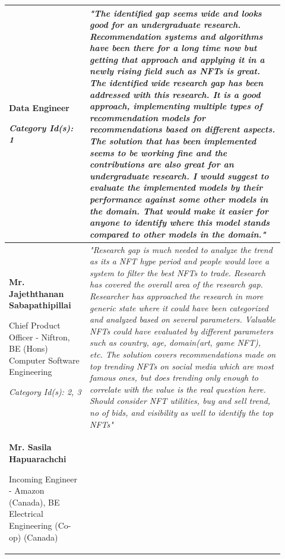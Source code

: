 \begin{longtable}{|p{0.27\linewidth}|p{0.655\linewidth}|}
Data Engineer

\textit{Category Id(s): 1}
&
\textit{"The identified gap seems wide and looks good for an undergraduate research. Recommendation systems and algorithms have been there for a long time now but getting that approach and applying it in a newly rising field such as NFTs is great. The identified wide research gap has been addressed with this research. It is a good approach, implementing multiple types of recommendation models for recommendations based on different aspects. The solution that has been implemented seems to be working fine and the contributions are also great for an undergraduate research. I would suggest to evaluate the implemented models by their performance against some other models in the domain. That would make it easier for anyone to identify where this model stands compared to other models in the domain."}
\\
\hline
\textbf{Mr. Jajeththanan Sabapathipillai}

Chief Product Officer - Niftron, BE (Hons) Computer Software Engineering

\textit{Category Id(s): 2, 3}
 &
 \textit{"Research gap is much needed to analyze the trend as its a NFT hype period and people would love a system to filter the best NFTs to trade. Research has covered the overall area of the research gap. Researcher has approached the research in more generic state where it could have been categorized and analyzed based on several parameters. Valuable NFTs could have evaluated by different parameters such as country, age, domain(art, game NFT), etc. The solution covers recommendations made on top trending NFTs on social media which are most famous ones, but does trending only enough to correlate with the value is the real question here. Should consider NFT utilities, buy and sell trend, no of bids, and visibility as well to identify the top NFTs"}
 \\
\hline
\textbf{Mr. Sasila Hapuarachchi}

 Incoming Engineer - Amazon (Canada),
 BE Electrical Engineering (Co-op) (Canada)


\end{longtable}
